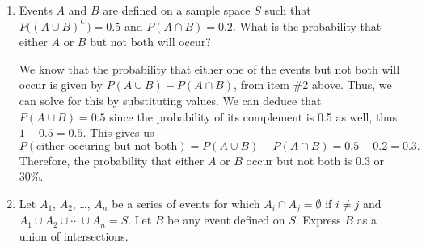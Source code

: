 \documentclass{article}
\begin{document}
\begin{enumerate}
\begin{proof}[Explanation]
        At first glance, this might seem true because \(A_1\), \(A_2\), and \(A_3\) all have the same probability of rolling a 6, which is \(\frac{1}{6}\), so multiplying this
        probability by 3 (for the three dice) gives us \(\frac{1}{2}\). However, this wouldn't represent \(P(A_1\cup{}A_2\cup{}A_3)\), because these events are not mutually exclusive. You can roll a 6
        on any one of these dice and still get a 6 on another. We can only add probabilities like that for unions when they are exclusive.\par 
        Rather, this probability should be interpreted as the probability that 
        \textit{at least} one of the dice shows up as 6. The only way this wont happen is if all of them aren't 6, which we can interpret as \(P(A_1^C\cap{}A_2^C\cap{}A_3^C)\). 
        Subtracting this by 1 should give us the probability of \(A_1\cup{}A_2\cup{}A_3\). Thus,\[
            P(A_1\cup{}A_2\cup{}A_3) = 1 - P(A_1^C\cap{}A_2^C\cap{}A_3^C) = 1 - {\biggl(\frac{5}{6}\biggr)}^3 \neq \frac{1}{2},
        \] which proves the statement is false. 
    \end{proof}
    Note that you could also solve this by using the expansion given by \textbf{Theorem 2.3.7}, but this way is a little bit more intuitive (just a little bit more). It 
    \textit{should} give the same answer as the one above.
    \item Events \(A\) and \(B\) are defined on a sample space \(S\) such that \(P\bigl({(A\cup{}B)}^C\bigr) =0.5\) and \(P(A\cap{}B) = 0.2\). What is
    the probability that either \(A\) or \(B\) but not both will occur?\begin{solution}
        We know that the probability that either one of the events but not both will occur is given by \(P(A\cup{}B) - P(A\cap{}B)\), from item \#2 above. Thus, we can solve
        for this by substituting values. We can deduce that \(P(A\cup{}B) = 0.5 \) since the probability of its complement is 0.5 as well, thus \(1 - 0.5 = 0.5\). This gives us\[
            P(\text{either occuring but not both}) = P(A\cup{}B) - P(A\cap{}B) = 0.5 - 0.2 = 0.3. 
        \] Therefore, the probability that either \(A\) or \(B\) occur but not both is 0.3 or 30\%. 
    \end{solution}
    \item Let \(A_1\), \(A_2\), \ldots, \(A_n\) be a series of events for which \(A_i \cap{}A_j = \emptyset\) if \(i\neq{}j\) and \(A_1\cup{}A_2\cup\cdots{}\cup{}A_n = S\). 
    Let \(B\) be any event defined on \(S\). Express \(B\) as a union of intersections.\begin{solution}

\end{solution}
\end{enumerate}
\end{document}
